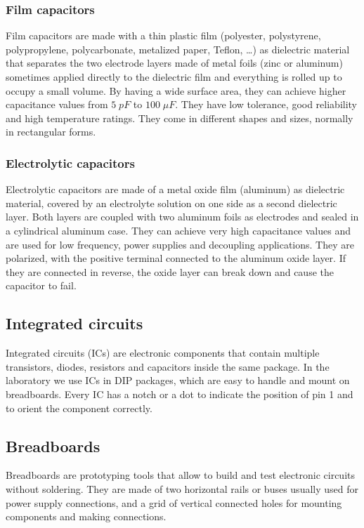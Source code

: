 \subsubsection*{Film capacitors}
Film capacitors are made with a thin plastic film (polyester, polystyrene, polypropylene, polycarbonate, metalized paper, Teflon,
\dots) as dielectric material  that separates the two electrode layers made of metal foils (zinc or aluminum) sometimes applied
directly to the dielectric film and everything is rolled up to occupy a small volume. By having a wide surface area, they can
achieve higher capacitance values from \(5 \; pF\) to \(100 \; \mu F\). They have low tolerance, good reliability and high
temperature ratings. They come in different shapes and sizes, normally in rectangular forms.

\subsubsection*{Electrolytic capacitors}
Electrolytic capacitors are made of a metal oxide film (aluminum) as dielectric material, covered by an electrolyte solution
on one side as a second dielectric layer. Both layers are coupled with two aluminum foils as electrodes and sealed in a cylindrical
aluminum case. They can achieve very high capacitance values and are used for low frequency, power supplies and decoupling applications.
They are polarized, with the positive terminal connected to the aluminum oxide layer. If they are connected in reverse, the oxide
layer can break down and cause the capacitor to fail.

\subsection{Integrated circuits}
Integrated circuits (ICs) are electronic components that contain multiple transistors, diodes, resistors and capacitors
inside the same package. In the laboratory we use ICs in DIP packages, which are easy to handle and mount on breadboards.
Every IC has a notch or a dot to indicate the position of pin 1 and to orient the component correctly.

\subsection{Breadboards}
Breadboards are prototyping tools that allow to build and test electronic circuits without soldering. They are made of two
horizontal rails or buses usually used for power supply connections, and a grid of vertical connected holes for mounting
components and making connections. 

